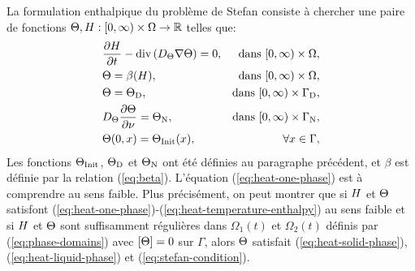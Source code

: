 La formulation enthalpique du problème de Stefan consiste à chercher
une paire de fonctions
$\Theta,H:[0,\infty)\times\Omega\to\mathbb R$
telles que:
\begin{align}
  & \frac{\partial \enthalpydensity}{\partial t} %
  - \div\parent{ \electrolytetdiff\nabla \temperature} = 0,%
  & \text{dans } [0,\infty)\times
    \Omega,\label{eq:heat-one-phase}\\
  & \temperature = \beta(\enthalpydensity),
    &\text{dans } [0,\infty)\times \Omega,\label{eq:heat-temperature-enthalpy}\\
  & \temperature = \temperature_\mathrm{D}, %
  & \text{dans } [0,\infty)\times \Gamma_\mathrm{D},\label{eq:heat-one-phase-dirichlet}\\
  & \electrolytetdiff\frac{\partial \temperature}{\partial \nu} = \temperature_\mathrm{N}, %
  & \text{dans } [0,\infty)\times \Gamma_\mathrm{N},\label{eq:heat-one-phase-neumann}\\
  & \temperature(0, x) = \tinit(x),
  & \forall x\in\Gamma,\label{eq:heat-initial-condition}
\end{align}
Les fonctions $\Theta_\text{Init}$, $\Theta_\mathrm{D}$ et
$\Theta_\mathrm{N}$ ont été définies au paragraphe précédent, et
$\beta$ est définie par la relation (\ref{eq:beta}). L'équation
(\ref{eq:heat-one-phase}) est à comprendre au sens faible. Plus
précisément, on peut montrer que si $H$ et
$\Theta$ satisfont
(\ref{eq:heat-one-phase})-(\ref{eq:heat-temperature-enthalpy}) au sens
faible et si
$H$ et $\Theta$ sont suffisamment régulières dans
$\Omega_1(t)$ et $\Omega_2(t)$ définis par (\ref{eq:phase-domains})
avec $\left[ \Theta \right] = 0$ sur $\Gamma$,
alors $\Theta$ satisfait (\ref{eq:heat-solid-phase}),
(\ref{eq:heat-liquid-phase}) et (\ref{eq:stefan-condition}).

